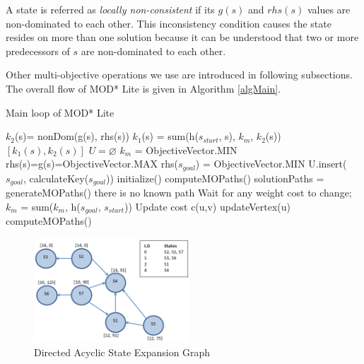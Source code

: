 \documentclass[10pt, a4paper, conference, compsocconf]{IEEEtran}
\newenvironment{definition}[1][Definition]{\begin{trivlist}
\item[\hskip \labelsep {\bfseries #1}]}{\end{trivlist}}
\begin{document}
\begin{definition}
A state is referred as \textit{locally non-consistent} if its $g(s)$ and $rhs(s)$ values are non-dominated to each other. This inconsistency condition causes the state resides on more than one solution because it can be understood that two or more predecessors of $s$ are non-dominated to each other.
\end{definition}

Other multi-objective operations we use are introduced in following subsections. The overall flow of MOD* Lite is given in Algorithm \ref{algMain}.

\begin{algorithm}
	\caption{Main loop of MOD* Lite}
	\label{algMain}
	{\fontsize{9}{9}\selectfont
    \begin{algorithmic}[1] %
      	\State $k_{2}$(s)= nonDom(g(s), rhs(s))
      	\State $k_{1}$(s) = sum(h($s_{start}$, s), $k_{m}$, $k_{2}$(s))
      	\State \Return $[k_{1}(s), k_{2}(s)]$
      \EndFunction
   	  \Statex
      	\State $U = \varnothing $
      	\State $k_{m}$ = ObjectiveVector.MIN
     		\State rhs(s)=g(s)=ObjectiveVector.MAX
     	\EndFor
      	\State rhs($s_{goal}$) = ObjectiveVector.MIN
      	\State U.insert($s_{goal}$, calculateKey($s_{goal}$))
	  \EndFunction
	  \Statex
      	\State initialize()
      	\State computeMOPaths()
    	      	\State solutionPaths = generateMOPaths()
    	      	 there is no known path \EndIf
    	      	\State Wait for any weight cost to change;
    	      		\State $k_{m}$ = sum($k_{m}$, h($s_{goal}$, $s_{start}$))
    	      			\State Update cost c(u,v)
    	      			\State updateVertex(u)
    	      		\EndFor
		      	\State computeMOPaths()
    	      	\EndIf
		\EndWhile
  	  \EndFunction
    \end{algorithmic}}
\end{algorithm}

\begin{figure}
\centering
\includegraphics[width=2.3in]{graph1v2}
\caption{Directed Acyclic State Expansion Graph}
\label{fig:graph1}
\end{figure}
\end{document}
